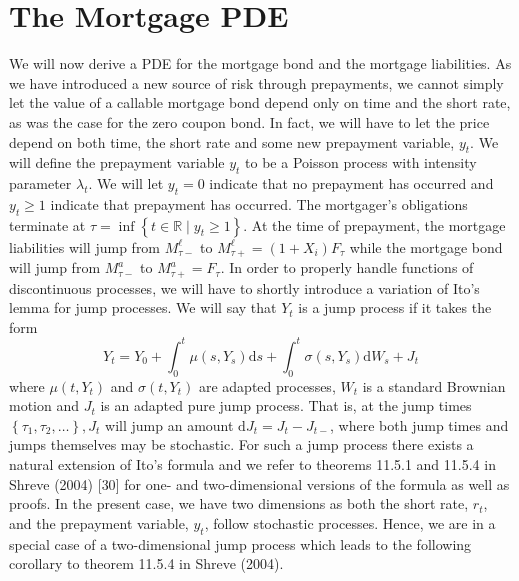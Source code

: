\documentclass[12pt,twoside]{reedthesis}
\begin{document}
\hypertarget{the-mortgage-pde}{%
\section{The Mortgage PDE}\label{the-mortgage-pde}}

We will now derive a PDE for the mortgage bond and the mortgage liabilities. As we have introduced a new source of risk through prepayments, we cannot simply let the value of a callable mortgage bond depend only on time and the short rate, as was the case for the zero coupon bond. In fact, we will have to let the price depend on both time, the short rate and some new prepayment variable, \(y_{t} .\) We will define the prepayment variable \(y_{t}\) to be a Poisson process with intensity parameter \(\lambda_{t}\). We will let \(y_{t}=0\) indicate that no prepayment has occurred and \(y_{t} \geq 1\) indicate that prepayment has occurred. The mortgager's obligations terminate at \(\tau=\inf \left\{t \in \mathbb{R} \mid y_{t} \geq 1\right\} .\) At the time of prepayment, the mortgage liabilities will jump from \(M_{\tau-}^{\ell}\) to \(M_{\tau+}^{\ell}=\left(1+X_{i}\right) F_{\tau}\) while the mortgage bond will jump from \(M_{\tau-}^{a}\) to \(M_{\tau+}^{a}=F_{\tau}\). In order to properly handle functions of discontinuous processes, we will have to shortly introduce a variation of Ito's lemma for jump processes. We will say that \(Y_{t}\) is a jump process if it takes the form
\[
Y_{t}=Y_{0}+\int_{0}^{t} \mu\left(s, Y_{s}\right) \mathrm{d} s+\int_{0}^{t} \sigma\left(s, Y_{s}\right) \mathrm{d} W_{s}+J_{t}
\]
where \(\mu\left(t, Y_{t}\right)\) and \(\sigma\left(t, Y_{t}\right)\) are adapted processes, \(W_{t}\) is a standard Brownian motion and \(J_{t}\) is an adapted pure jump process. That is, at the jump times \(\left\{\tau_{1}, \tau_{2}, \ldots\right\}, J_{t}\) will jump an amount \(\mathrm{d} J_{t}=J_{t}-J_{t-}\), where both jump times and jumps themselves may be stochastic. For such a jump process there exists a natural extension of Ito's formula and we refer to theorems 11.5.1 and 11.5.4 in Shreve (2004) {[}30{]} for one- and two-dimensional versions of the formula as well as proofs. In the present case, we have two dimensions as both the short rate, \(r_{t}\), and the prepayment variable, \(y_{t}\), follow stochastic processes. Hence, we are in a special case of a two-dimensional jump process which leads to the following corollary to theorem 11.5.4 in Shreve (2004).
\end{document}

